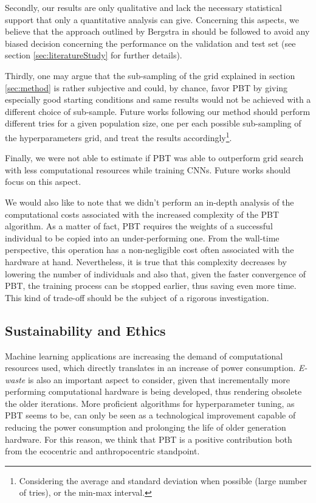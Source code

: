 \documentclass{article}
\begin{document}
Secondly, our results are only qualitative and lack the necessary statistical support that only a quantitative analysis can give. Concerning this aspects, we believe that the approach outlined by Bergstra in \cite{Bergstra:2012:RSH:2188385.2188395} should be followed to avoid any biased decision concerning the performance on the validation and test set (see section \ref{sec:literatureStudy} for further details).

Thirdly, one may argue that the sub-sampling of the grid explained in section \ref{sec:method} is rather subjective and could, by chance, favor PBT by giving especially good starting conditions and same results would not be achieved with a different choice of sub-sample. Future works following our method should perform different tries for a given population size, one per each possible sub-sampling of the hyperparameters grid, and treat the results accordingly\footnote{Considering the average and standard deviation when possible (large number of tries), or the min-max interval.}.

Finally, we were not able to estimate if PBT was able to outperform grid search with less computational resources while training CNNs. Future works should focus on this aspect.

We would also like to note that we didn't perform an in-depth analysis of the computational costs associated with the increased complexity of the PBT algorithm. As a matter of fact, PBT requires the weights of a successful individual to be copied into an under-performing one. From the wall-time perspective, this operation has a non-negligible cost often associated with the hardware at hand. 
Nevertheless, it is true that this complexity decreases by lowering the number of individuals and also that, given the faster convergence of PBT, the training process can be stopped earlier, thus saving even more time. This kind of trade-off should be the subject of a rigorous investigation.


\subsection{Sustainability and Ethics}

Machine learning applications are increasing the demand of computational resources used, which directly translates in an increase of power consumption. \textit{E-waste} is also an important aspect to consider, given that incrementally more performing computational hardware is being developed, thus rendering obsolete the older iterations. More proficient algorithms for hyperparameter tuning, as PBT seems to be, can only be seen as a technological improvement capable of reducing the power consumption and prolonging the life of older generation hardware. For this reason, we think that PBT is a positive contribution both from the ecocentric and anthropocentric standpoint.
\end{document}
